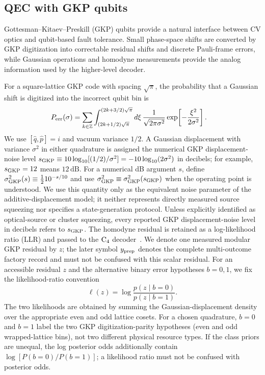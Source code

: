 \documentclass[aps,
prx,
superscriptaddress,
reprint,
longbibliography,
floatfix]{revtex4-2}
\begin{document}
\subsection{QEC with GKP qubits}\label{sec:gkp_interface}

Gottesman--Kitaev--Preskill (GKP) qubits provide a natural interface between CV optics and qubit-based fault tolerance. Small phase-space shifts are converted by GKP digitization into correctable residual shifts and discrete Pauli-frame errors, while Gaussian operations and homodyne measurements provide the analog information used by the higher-level decoder.

For a square-lattice GKP code with spacing $\sqrt{\pi}$, the probability that a Gaussian shift is digitized into the incorrect qubit bin is
\begin{equation}
\begin{aligned}
P_{\rm err}(\sigma)
&=
\sum_{k\in\mathbb Z}
\int_{(2k+1/2)\sqrt{\pi}}^{(2k+3/2)\sqrt{\pi}}
 d\xi\,
\frac{1}{\sqrt{2\pi\sigma^2}}
\exp\!\left[-\frac{\xi^2}{2\sigma^2}\right].
\end{aligned}
\label{eq:gkp_digitized_error_main}
\end{equation}
We use $[\hat q,\hat p]=i$ and vacuum variance $1/2$. A Gaussian displacement with variance $\sigma^2$ in either quadrature is assigned the numerical GKP displacement-noise level $s_{\rm GKP}\equiv10\log_{10}[(1/2)/\sigma^2]=-10\log_{10}(2\sigma^2)$ in decibels; for example, $s_{\rm GKP}=12$ means $12\,\mathrm{dB}$. For a numerical dB argument $s$, define $\sigma_{\rm GKP}^2(s)\equiv\tfrac12 10^{-s/10}$ and use $\sigma_{\rm GKP}^2\equiv\sigma_{\rm GKP}^2(s_{\rm GKP})$ when the operating point is understood. We use this quantity only as the equivalent noise parameter of the additive-displacement model; it neither represents directly measured source squeezing nor specifies a state-generation protocol. Unless explicitly identified as optical-source or cluster squeezing, every reported GKP displacement-noise level in decibels refers to $s_{\rm GKP}$. The homodyne residual is retained as a log-likelihood ratio (LLR) and passed to the ${\rm C_4}$ decoder~\cite{GKP2001,glancy2006error,fukui2017analog}. We denote one measured modular GKP residual by $z$; the later symbol $y_{\rm prep}$ denotes the complete multi-outcome factory record and must not be confused with this scalar residual. For an accessible residual $z$ and the alternative binary error hypotheses $b=0,1$, we fix the likelihood-ratio convention
\begin{equation}
\ell(z)=\log\frac{p(z\mid b=0)}{p(z\mid b=1)}.
\label{eq:gkp_llr_main}
\end{equation}
The two likelihoods are obtained by summing the Gaussian-displacement density over the appropriate even and odd lattice cosets. For a chosen quadrature, $b=0$ and $b=1$ label the two GKP digitization-parity hypotheses (even and odd wrapped-lattice bins), not two different physical resource types. If the class priors are unequal, the log posterior odds additionally contain $\log[P(b=0)/P(b=1)]$; a likelihood ratio must not be confused with posterior odds.
\end{document}
